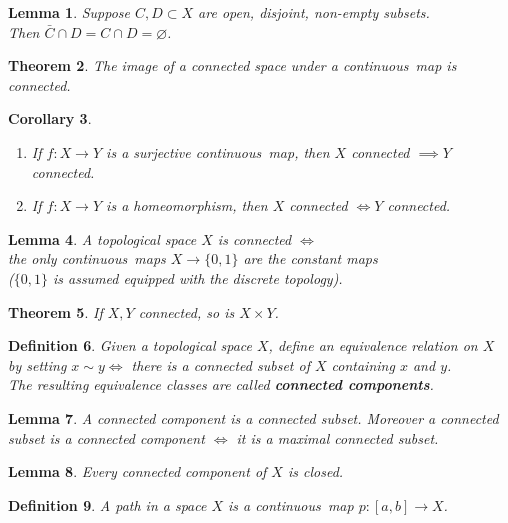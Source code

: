 \documentclass{article}
\newcommand{\cts}{continuous\ }
\renewcommand{\emptyset}{\varnothing}
\newtheorem{theorem}{Theorem}[section]
\newtheorem{corollary}[theorem]{Corollary}
\newtheorem{lemma}[theorem]{Lemma}
\newtheorem{definition}[theorem]{Definition}
\theoremstyle{remark}
\theoremstyle{example}
\theoremstyle{examples}
\begin{document}
	\begin{lemma}
		Suppose $C,D \subset X$ are open, disjoint, non-empty subsets.\\
		Then $\bar{C} \cap D = C \cap D = \emptyset$.
	\end{lemma}

	\begin{theorem}
		The image of a connected space under a \cts map is connected.
	\end{theorem}

	\begin{corollary}
		\begin{enumerate}
			\item If $f:X \to Y$ is a surjective \cts map,
			then $X$ connected $\implies Y$ connected.
			\item If $f:X \to Y$ is a homeomorphism,
			then $X$ connected $\iff Y$ connected.
		\end{enumerate}
	\end{corollary}

	\begin{lemma}
		A topological space $X$ is connected $\iff$\\
		the only \cts maps $X \to \{0,1\}$ are the constant maps\\
		($\{0,1\}$ is assumed equipped with the discrete topology).
	\end{lemma}

	\begin{theorem}
		If $X,Y$ connected, so is $X \times Y$.
	\end{theorem}

	\begin{definition}
		Given a topological space $X$, define an equivalence relation on $X$
		by setting $x \sim y \iff$
		there is a connected subset of $X$ containing $x$ and $y$.\\
		The resulting equivalence classes are called \textbf{connected components}.
	\end{definition}

	\begin{lemma}
		A connected component is a connected subset.
		Moreover a connected subset is a connected component $\iff$
		it is a maximal connected subset.
	\end{lemma}

	\begin{lemma}
		Every connected component of $X$ is closed.
	\end{lemma}

	\begin{definition}
		A path in a space $X$ is a \cts map $p:[a,b] \to X$.
	\end{definition}
\end{document}
